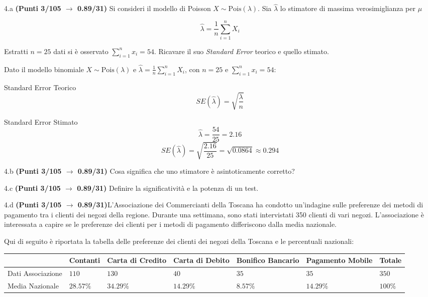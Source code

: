 \documentclass[
  11pt,
]{book}
\theoremstyle{mytheoremstyle}
\theoremstyle{mydefstyle}
\newenvironment{sol}
  {
  \begin{tcolorbox}[enhanced,breakable,arc=0.1mm,boxrule=1pt,colback=white,colframe=iblue,
  title=\bf \fontfamily{lmss}\selectfont \hspace{.5 cm} Soluzione,drop fuzzy shadow]

}{
\end{tcolorbox}
  }
\begin{document}
4.a \textbf{(Punti 3/105 \(\rightarrow\) 0.89/31)} Si consideri il modello di Poisson \(X\sim\text{Pois}(\lambda)\). Sia \(\hat\lambda\) lo stimatore di massima verosimiglianza per \(\mu\)

\[
  \hat\lambda = \frac 1n \sum_{i=1}^n X_i
\]

Estratti \(n=25\) dati si è osservato \(\sum_{i=1}^nx_i=54\). Ricavare il suo \emph{Standard Error} teorico e quello stimato.

\begin{sol}
Dato il modello binomiale \(X \sim \text{Pois}(\lambda)\) e \(\hat\lambda = \frac{1}{n} \sum_{i=1}^n X_i\), con \(n = 25\) e \(\sum_{i=1}^n x_i = 54\):

Standard Error Teorico
\[
SE(\hat\lambda) = \sqrt{\frac{\lambda}{n}}
\]

Standard Error Stimato
\[
\hat\lambda = \frac{54}{25} = 2.16
\]
\[
SE(\hat\lambda) = \sqrt{\frac{2.16}{25}} = \sqrt{0.0864} \approx 0.294
\]

\end{sol}

4.b \textbf{(Punti 3/105 \(\rightarrow\) 0.89/31)} Cosa significa che uno stimatore è asintoticamente corretto?

4.c \textbf{(Punti 3/105 \(\rightarrow\) 0.89/31)} Definire la significatività e la potenza di un test.

4.d \textbf{(Punti 3/105 \(\rightarrow\) 0.89/31)}L'Associazione dei Commercianti della Toscana ha condotto un'indagine sulle preferenze dei metodi di pagamento tra i clienti dei negozi della regione. Durante una settimana, sono stati intervistati 350 clienti di vari negozi. L'associazione è interessata a capire se le preferenze dei clienti per i metodi di pagamento differiscono dalla media nazionale.

Qui di seguito è riportata la tabella delle preferenze dei clienti dei negozi della Toscana e le percentuali nazionali:

\begin{table}[H]
\centering
\begin{tabular}{lllllll}
\toprule
  & Contanti & Carta di Credito & Carta di Debito & Bonifico Bancario & Pagamento Mobile & Totale\\
\midrule
Dati Associazione & $110$ & $130$ & $40$ & $35$ & $35$ & $350$\\
Media Nazionale & $28.57\%$ & $34.29\%$ & $14.29\%$ & $8.57\%$ & $14.29\%$ & $100\%$\\
\bottomrule
\end{tabular}
\end{table}
\end{document}
